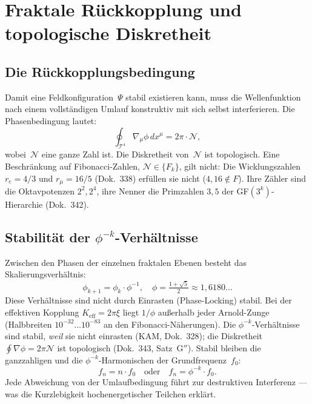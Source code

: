\section{Fraktale Rückkopplung und topologische Diskretheit}

\subsection{Die Rückkopplungsbedingung}

Damit eine Feldkonfiguration~$\Psi$ stabil existieren kann, muss die
Wellenfunktion nach einem vollständigen Umlauf konstruktiv mit sich selbst
interferieren. Die Phasenbedingung lautet:
\begin{equation}
  \oint_{\mathcal{T}^4} \nabla_{\mu}\phi\,dx^\mu = 2\pi\cdot\mathcal{N},
\end{equation}
wobei~$\mathcal{N}$ eine ganze Zahl ist. Die Diskretheit von~$\mathcal{N}$
ist topologisch. Eine Beschränkung auf Fibonacci-Zahlen,
$\mathcal{N} \in \{F_k\}$, gilt nicht: Die Wicklungszahlen $r_e = 4/3$ und
$r_\mu = 16/5$ (Dok.~338) erfüllen sie nicht ($4, 16 \notin F$). Ihre Zähler
sind die Oktavpotenzen $2^2, 2^4$, ihre Nenner die Primzahlen $3, 5$ der
GF$(3^k)$-Hierarchie (Dok.~342).

\subsection{Stabilität der $\phi^{-k}$-Verhältnisse}

Zwischen den Phasen der einzelnen fraktalen Ebenen besteht das
Skalierungsverhältnis:
\begin{equation}
  \phi_{k+1} = \phi_k \cdot \phi^{-1}, \quad
  \phi = \tfrac{1+\sqrt{5}}{2} \approx 1{,}6180\ldots
\end{equation}
Diese Verhältnisse sind nicht durch Einrasten (Phase-Locking) stabil. Bei
der effektiven Kopplung $K_\mathrm{eff} = 2\pi\xi$ liegt $1/\phi$ außerhalb
jeder Arnold-Zunge (Halbbreiten $10^{-32}\ldots10^{-83}$ an den
Fibonacci-Näherungen). Die $\phi^{-k}$-Verhältnisse sind stabil, \emph{weil}
sie nicht einrasten (KAM, Dok.~328); die Diskretheit
$\oint\nabla\phi = 2\pi\mathcal{N}$ ist topologisch (Dok.~343, Satz~G$''$).
Stabil bleiben die ganzzahligen und die $\phi^{-k}$-Harmonischen der
Grundfrequenz~$f_0$:
\begin{equation}
  f_n = n \cdot f_0 \quad \text{oder} \quad f_n = \phi^{-k}\cdot f_0.
\end{equation}
Jede Abweichung von der Umlaufbedingung führt zur destruktiven
Interferenz — was die Kurzlebigkeit hochenergetischer Teilchen erklärt.

